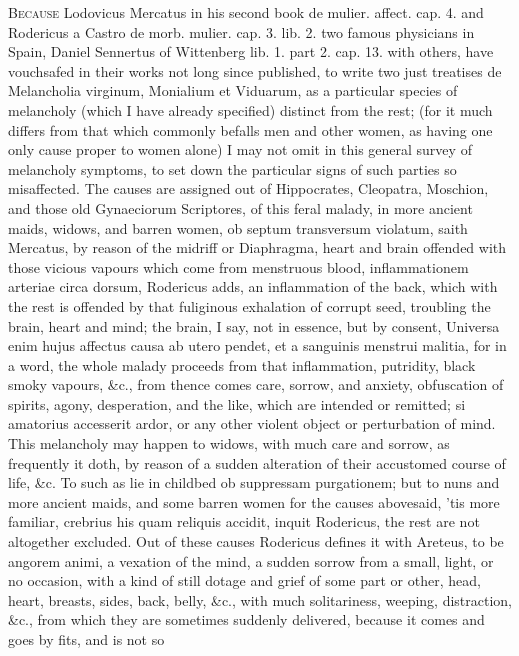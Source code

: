{\lettrine{B}{ecause} Lodovicus Mercatus in his second book de mulier. affect. cap.
4. and Rodericus a Castro de morb. mulier. cap. 3. lib. 2. two famous
physicians in Spain, Daniel Sennertus of Wittenberg lib. 1. part 2.
cap. 13. with others, have vouchsafed in their works not long since
published, to write two just treatises de Melancholia virginum,
Monialium et Viduarum, as a particular species of melancholy (which I
have already specified) distinct from the rest; (for it much
differs from that which commonly befalls men and other women, as having
one only cause proper to women alone) I may not omit in this general
survey of melancholy symptoms, to set down the particular signs of such
parties so misaffected.
The causes are assigned out of Hippocrates, Cleopatra, Moschion, and
those old Gynaeciorum Scriptores, of this feral malady, in more ancient
maids, widows, and barren women, ob septum transversum violatum, saith
Mercatus, by reason of the midriff or Diaphragma, heart and brain
offended with those vicious vapours which come from menstruous blood,
inflammationem arteriae circa dorsum, Rodericus adds, an inflammation
of the back, which with the rest is offended by that fuliginous
exhalation of corrupt seed, troubling the brain, heart and mind; the
brain, I say, not in essence, but by consent, Universa enim hujus
affectus causa ab utero pendet, et a sanguinis menstrui malitia, for in
a word, the whole malady proceeds from that inflammation, putridity,
black smoky vapours, \&c., from thence comes care, sorrow, and anxiety,
obfuscation of spirits, agony, desperation, and the like, which are
intended or remitted; si amatorius accesserit ardor, or any other
violent object or perturbation of mind. This melancholy may happen to
widows, with much care and sorrow, as frequently it doth, by reason of
a sudden alteration of their accustomed course of life, \&c. To such as
lie in childbed ob suppressam purgationem; but to nuns and more ancient
maids, and some barren women for the causes abovesaid, 'tis more
familiar, crebrius his quam reliquis accidit, inquit Rodericus, the
rest are not altogether excluded.
Out of these causes Rodericus defines it with Areteus, to be angorem
animi, a vexation of the mind, a sudden sorrow from a small, light, or
no occasion, with a kind of still dotage and grief of some part
or other, head, heart, breasts, sides, back, belly, \&c., with much
solitariness, weeping, distraction, \&c., from which they are sometimes
suddenly delivered, because it comes and goes by fits, and is not so
}
